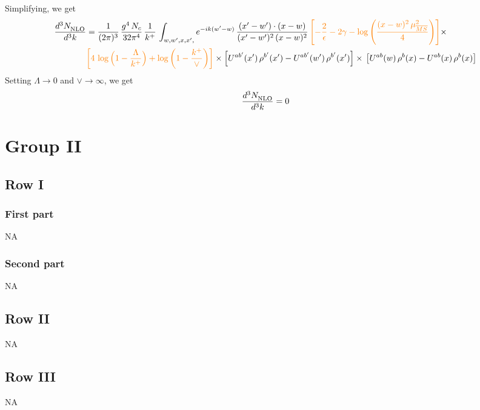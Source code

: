 \documentclass[9pt]{article}
\numberwithin{equation}{section}
\begin{document}
Simplifying, we get
\begin{align}
     \frac{d^{3}N_{\rm NLO}^{\rm}}{d^{3}k} &  =  \frac{1}{(2\pi)^{3}}\, \frac{g^{4}\,N_{c}}{32\pi^{4}}\,\frac{1}{k^{+}}\, \int_{w, w',x,x',} e^{-ik(w^\prime-w)}\, \frac{(x'-w')\cdot (x-w)}{(x'-w')^{2}\, (x-w)^{2}}\, {\color{orange}\left[-\frac{2}{\epsilon}-2\gamma-\log{\left(\frac{(x-w)^{2}\,\mu^{2}_{\overline{MS}}}{4}\right)}\right]}\times \notag \\ & {\color{orange}\left[4\,\log\Big(1-\frac{\Lambda}{k^{+}}\Big)+\log{\left(1-\frac{k^{+}}{\vee}\right)}\right]}\times\left[U^{ab'}(x')\,\rho^{b'}(x') - U^{ab'}(w')\,\rho^{b'}(x')\right]\times\,\left[U^{ab}(w)\,\rho^{b}(x) - U^{ab}(x)\,\rho^{b}(x)\right]
\end{align}
Setting $\Lambda \to 0$ and $\vee \to \infty$, we get
$$\frac{d^{3}N_{\rm NLO}^{\rm}}{d^{3}k}  = 0 $$
\section{Group II}
\subsection{Row I}
\subsubsection{First part}
\textsc{NA}
\subsubsection{Second part}
\textsc{NA}
\subsection{Row II}
\textsc{NA}
\subsection{Row III}
\textsc{NA}
\end{document}
